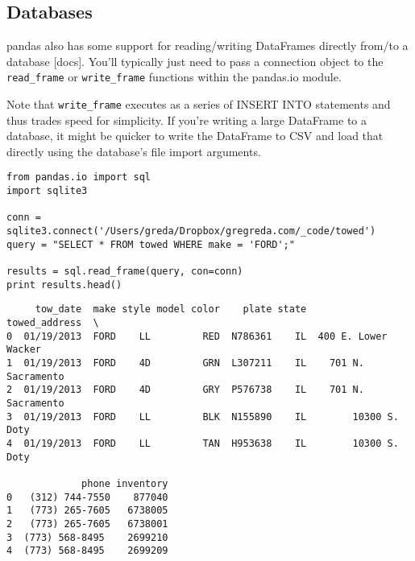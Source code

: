 \subsection{Databases}

pandas also has some support for reading/writing DataFrames directly from/to a database [docs]. You'll typically just need to pass a connection object to the \texttt{read\_frame} or \texttt{write\_frame} functions within the pandas.io module.

Note that \texttt{write\_frame} executes as a series of INSERT INTO statements and thus trades speed for simplicity. If you're writing a large DataFrame to a database, it might be quicker to write the DataFrame to CSV and load that directly using the database's file import arguments.

\begin{framed}
\begin{verbatim}
from pandas.io import sql
import sqlite3

conn = sqlite3.connect('/Users/greda/Dropbox/gregreda.com/_code/towed')
query = "SELECT * FROM towed WHERE make = 'FORD';"

results = sql.read_frame(query, con=conn)
print results.head()
\end{verbatim}
\end{framed}
\begin{verbatim}
     tow_date  make style model color    plate state        towed_address  \
0  01/19/2013  FORD    LL         RED  N786361    IL  400 E. Lower Wacker   
1  01/19/2013  FORD    4D         GRN  L307211    IL    701 N. Sacramento   
2  01/19/2013  FORD    4D         GRY  P576738    IL    701 N. Sacramento   
3  01/19/2013  FORD    LL         BLK  N155890    IL        10300 S. Doty   
4  01/19/2013  FORD    LL         TAN  H953638    IL        10300 S. Doty   

             phone inventory  
0   (312) 744-7550    877040  
1   (773) 265-7605   6738005  
2   (773) 265-7605   6738001  
3  (773) 568-8495    2699210  
4  (773) 568-8495    2699209  

\end{verbatim}



